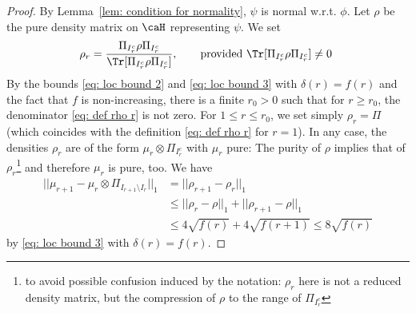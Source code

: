 \begin{proof}
	By Lemma~\ref{lem: condition for normality}, $\psi$ is normal w.r.t. $\phi$. Let $\rho$ be the pure density matrix on $\caH$ representing $\psi$.
	We set 
	\begin{equation} \label{eq: def rho r}
		\rho_r= \frac{\Pi_{I_{r}^c}\rho \Pi_{I_{r}^c}}{\Tr[\Pi_{I_{r}^c}\rho \Pi_{I_{r}^c}]}, \qquad \text{provided  $\Tr[\Pi_{I_{r}^c}\rho \Pi_{I_{r}^c}] \neq 0$  }  
	\end{equation}  
	By the bounds \eqref{eq: loc bound 2} and \eqref{eq: loc bound 3} with $\delta(r)=f(r)$ and the fact that $f$ is non-increasing, there is a finite $r_0>0$ such that for $r\geq r_0$, the denominator  \eqref{eq: def rho r} is not zero.
	For $1 \leq r\leq r_0$, we set simply $\rho_r=\Pi$ (which coincides with the definition \eqref{eq: def rho r} for $r=1$).  In any case, the densities $\rho_r$ are of the form $\mu_r\otimes \Pi_{I_r^c}$ with $\mu_r$ pure: The purity of $\rho$ implies that of $\rho_r$\footnote{to avoid possible confusion induced by the notation: $\rho_r$ here is not a reduced density matrix, but the compression of $\rho$ to the range of $\Pi_{I_{r}^c}$} and therefore $\mu_r$ is pure, too.
	We have
	\begin{align*}
		||\mu_{r+1}-\mu_r\otimes \Pi_{I_{r+1}\setminus I_r}||_1 &= ||\rho_{r+1}-\rho_r||_1 \\
		&\leq ||\rho_r-\rho||_1 +||\rho_{r+1}-\rho||_1 \\
		&\leq  4\sqrt{f(r)}+4\sqrt{f(r+1)} \leq 8\sqrt{f(r)}
	\end{align*}
	by \eqref{eq: loc bound 3} with  $\delta(r)=f(r)$.
	

\end{proof}
